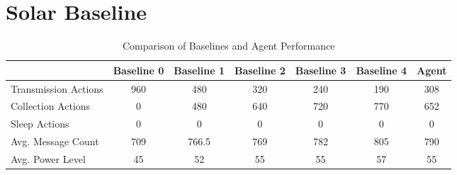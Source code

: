 \documentclass[10pt]{cai}
\begin{document}
\section{Solar Baseline}
\begin{table}[h!]
  \centering
  \begin{tabular}{lcccccc}
  \hline
   & Baseline 0 & Baseline 1 & Baseline 2 & Baseline 3 & Baseline 4 & Agent \\
  \hline
  Transmission Actions & 960 & 480 & 320 & 240 & 190 & 308 \\
  Collection Actions   & 0   & 480 & 640 & 720 & 770 & 652 \\
  Sleep Actions        & 0   & 0   & 0   & 0   & 0   & 0   \\
  Avg. Message Count   & 709 & 766.5 & 769 & 782 & 805 & 790 \\
  Avg. Power Level     & 45  & 52  & 55  & 55  & 57  & 55  \\
  \hline
  \end{tabular}
  \caption{Comparison of Baselines and Agent Performance}
  \label{table:baselines_vs_agent}
  \end{table}
  

\printbibliography[heading=subbibintoc]
\end{document}

